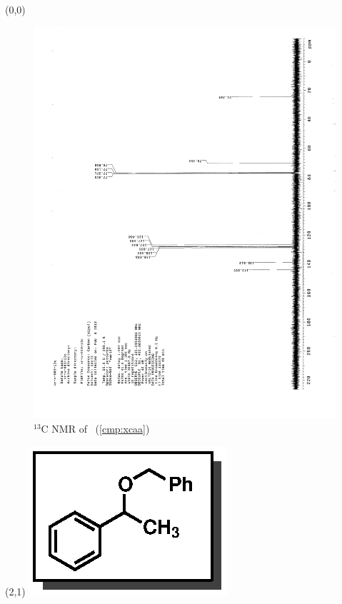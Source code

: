 \clearpage
\begin{textblock}{20}(0,0)
\begin{figure}[htb]
\caption{$^{13}$C NMR of  \CMPxcaa\ (\ref{cmp:xcaa})}
\includegraphics[scale=0.75, trim = 0mm 0mm 0mm 5mm,
clip]{chp_alkylation/images/nmr/xcaaC}
\vspace{-100pt}
\end{figure}
\end{textblock}
\begin{textblock}{1}(2,1)
\includegraphics[scale=0.8, angle=90]{chp_alkylation/images/xcaa}
\end{textblock}
\clearpage

